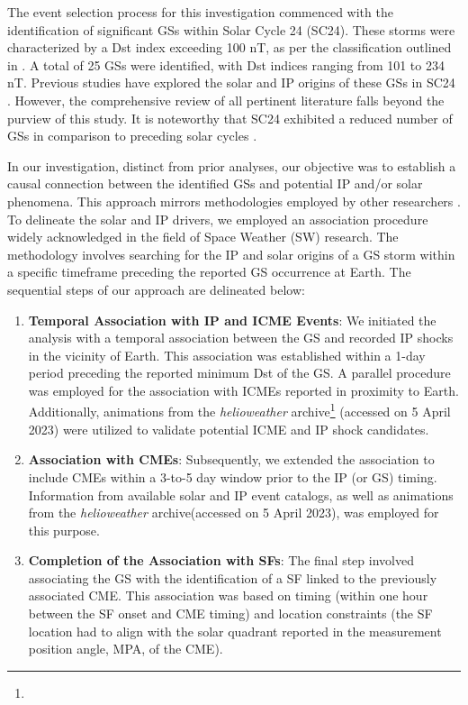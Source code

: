 The event selection process for this investigation commenced with the identification of significant GSs within Solar Cycle 24 (SC24). These storms were characterized by a Dst index exceeding 100 nT, as per the classification outlined in \citet{gonzalez_1994}. A total of 25 GSs were identified, with Dst indices ranging from 101 to 234 nT. Previous studies have explored the solar and IP origins of these GSs in SC24 \citep{gopalswamy_gs_2022, qiu_2022, besliu_2022, abe_2023}. However, the comprehensive review of all pertinent literature falls beyond the purview of this study. It is noteworthy that SC24 exhibited a reduced number of GSs in comparison to preceding solar cycles \citep{selvakumaran_2016}.

In our investigation, distinct from prior analyses, our objective was to establish a causal connection between the identified GSs and potential IP and/or solar phenomena. This approach mirrors methodologies employed by other researchers \citep{zhang_2007, gonzalez_2007, gopalswamy_2008, echer_2013, manu_2022}. To delineate the solar and IP drivers, we employed an association procedure widely acknowledged in the field of Space Weather (SW) research. The methodology involves searching for the IP and solar origins of a GS storm within a specific timeframe preceding the reported GS occurrence at Earth. The sequential steps of our approach are delineated below:

\begin{enumerate}
	\item \textbf{Temporal Association with IP and ICME Events}:
	We initiated the analysis with a temporal association between the GS and recorded IP shocks in the vicinity of Earth. This association was established within a 1-day period preceding the reported minimum Dst of the GS. A parallel procedure was employed for the association with ICMEs reported in proximity to Earth. Additionally, animations from the \textit{helioweather} archive\footnote{\helioweatherurl} (accessed on 5 April 2023) were utilized to validate potential ICME and IP shock candidates.
	
	\item \textbf{Association with CMEs}:
	Subsequently, we extended the association to include CMEs within a 3-to-5 day window prior to the IP (or GS) timing. Information from available solar and IP event catalogs, as well as animations from the \textit{helioweather} archive\footnotemark[\value{footnote}] (accessed on 5 April 2023), was employed for this purpose.
	
	\item \textbf{Completion of the Association with SFs}:
	The final step involved associating the GS with the identification of a SF linked to the previously associated CME. This association was based on timing (within one hour between the SF onset and CME timing) and location constraints (the SF location had to align with the solar quadrant reported in the measurement position angle, MPA, of the CME).
\end{enumerate}

